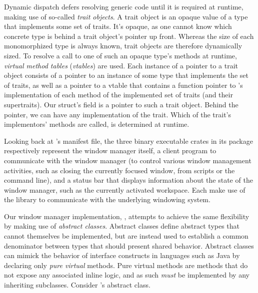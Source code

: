 Dynamic dispatch defers resolving generic code until it is required at
runtime, making use of so-called \textit{trait objects}\cite{therustbook,
rustdynamicdispatch}. A trait object is an opaque value of a type that
implements some set of traits\cite{therustreference}. It's opaque,
as one cannot know which concrete type is behind a trait object's
pointer up front\cite{therustreference}. Whereas the size of each
monomorphized type is always known, trait objects are therefore dynamically
sized\cite{therustreference}. To resolve a call to one of such an opaque
type's methods at runtime, \textit{virtual method tables} (\textit{vtables})
are used\cite{therustreference}. Each instance of a pointer to a trait object
consists of a pointer to an instance of some type  that implements
the set of traits, as well as a pointer to a vtable that contains a function
pointer to 's implementation of each method of the implemented set of
traits (and their supertraits)\cite{therustreference}. Our  struct's
 field is a pointer to such a trait object. Behind the pointer, we
can have any implementation of the  trait. Which of the trait's
implementors' methods are called, is determined at runtime.

Looking back at \wmrs's manifest file, the three binary executable crates in
its package respectively represent the window manager itself, a client program
to communicate with the window manager (to control various window management
activities, such as closing the currently focused window, from scripts or the
command line), and a status bar that displays information about the state of the
window manager, such as the currently activated workspace. Each make use of the
 library to communicate with the underlying windowing system.


Our \cpp window manager implementation, \wmcpp, attempts to achieve the same
flexibility by making use of \textit{abstract classes}. Abstract classes define
abstract types that cannot themselves be implemented, but are instead used
to establish a common denominator between types that should present shared
behavior. Abstract classes can mimick the behavior of interface constructs in
languages such as Java by declaring only \textit{pure virtual} methods. Pure
virtual methods are methods that do not expose any associated inline logic, and
as such \textit{must} be implemented by any inheriting subclasses. Consider
\wmcpp's  abstract class.

